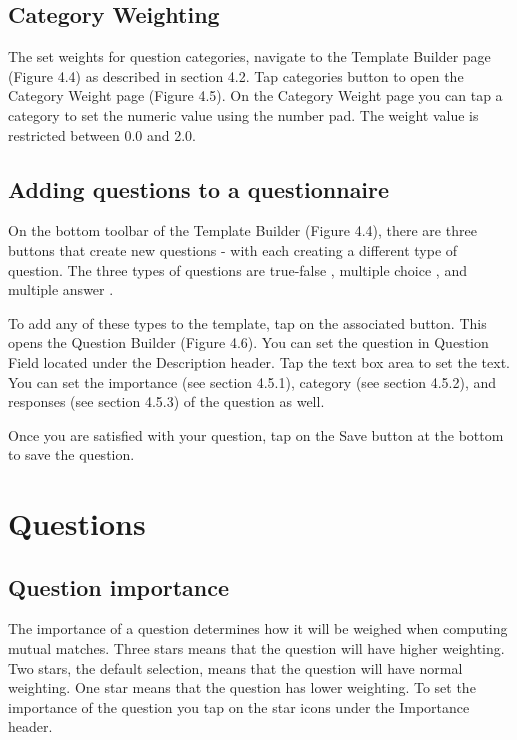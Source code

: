 \documentclass[a4paper,11pt,titlepage]{scrartcl}
\begin{document}
\subsection{Category Weighting}
\label{sec:categoryweight}
The set weights for question categories, navigate to the Template Builder page (Figure 4.4) as described in section 4.2.  Tap categories button    to open the Category Weight page (Figure 4.5).  On the Category Weight page you can tap a category to set the numeric value using the number pad.  The weight value is restricted between 0.0 and 2.0.

\subsection{Adding questions to a questionnaire}
\label{sec:addquestion}
On the bottom toolbar of the Template Builder (Figure 4.4), there are three buttons that create new questions - with each creating a different type of question. The three types of questions are  true-false  , multiple choice  , and multiple answer  . 

To add any of these types to the template, tap on the associated button.  This opens the Question Builder (Figure 4.6).  You can set the question in Question Field located under the Description header. Tap the text box area to set the text.  You can set the importance (see section 4.5.1),  category (see section 4.5.2), and responses (see section 4.5.3) of the question as well.

Once you are satisfied with your question, tap on the Save button at the bottom to save the question. 

\clearpage
\section{Questions}
\label{sec:questions}

\subsection{Question importance}
\label{sec:qimportance}
The importance of a question determines how it will be weighed when computing mutual matches.  Three stars means that the question will have higher weighting. Two stars, the default selection, means that the question will have normal weighting. One star means that the question has lower weighting.  To set the importance of the question you tap on the star icons   under the Importance header. 
\end{document}
